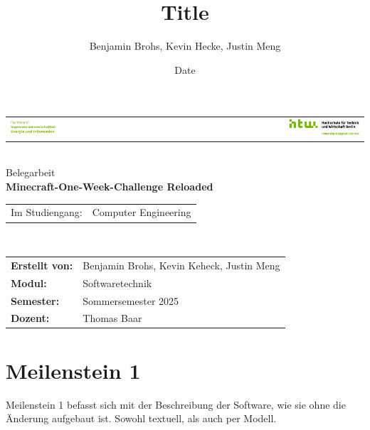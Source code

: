 \documentclass{article}
\title{Title}
\author{Benjamin Brohs, Kevin Hecke, Justin Meng}
\date{Date}
\begin{document}

\begin{titlepage}
  \centering
	\begin{tabular}{lcr}
		\includegraphics[width=0.35\textwidth]{fachbereich.png} & \hspace{0.195\textwidth} & \includegraphics[width=0.35\textwidth]{Q04_HTW_Berlin_Logo_quer_pos_FARBIG_RGB.jpg}\\
	\end{tabular}	
	\\[3cm]
	\Large
	Belegarbeit\\
	\vspace{2cm}
	\textbf{Minecraft-One-Week-Challenge Reloaded}\\
	\vspace{2cm}
	\begin{tabular}{ll} 
		Im Studiengang: & Computer Engineering \\		
	\end{tabular}	
	\\[3cm]
	\normalsize
	\begin{tabular}{ll}
	      \textbf{Erstellt von:} & Benjamin Brohs, Kevin Keheck, Justin Meng \\
        \textbf{Modul:} & Softwaretechnik \\
        \textbf{Semester:} & Sommersemester 2025 \\
	\textbf{Dozent:} & Thomas Baar
	\end{tabular}	
\end{titlepage}

\tableofcontents

\newpage


\section{Meilenstein 1} \label{sec:ms1}

Meilenstein 1 befasst sich mit der Beschreibung der Software, wie sie ohne die Änderung aufgebaut ist. Sowohl textuell, als auch per Modell.
\end{document}
